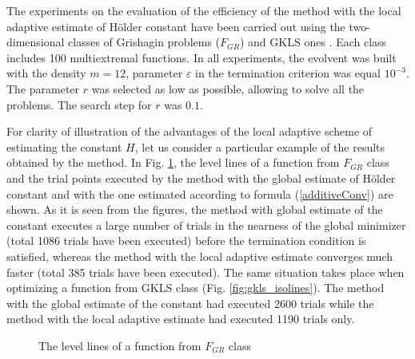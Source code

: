 \documentclass[procedia]{easychair}
\begin{document}
The experiments on the evaluation of the efficiency of the method with the local
adaptive estimate of Hölder constant have been carried out using the two-dimensional
classes of Grishagin problems (\(F_{GR}\)) \cite{grishaginClass} and GKLS ones \cite{gklsClass}. Each class
includes 100 multiextremal functions. In all experiments, the evolvent was built
with the density \(m = 12\), parameter \(\varepsilon\) in the termination criterion was equal \(10^{-3}\).
The parameter \(r\) was selected as low as possible, allowing to solve all the
problems. The search step for \(r\) was \(0.1\).
\par
For clarity of illustration of the advantages of the local adaptive scheme of estimating
the constant \(H\), let us consider a particular example of the results obtained by the method.
In Fig. \ref{fig:grish_isolines}, the level lines of a function from \(F_{GR}\) class and the trial
points executed by the method with the global estimate of Hölder constant and with
the one estimated according to formula (\ref{additiveConv}) are shown. As it is
seen from the figures, the method with global estimate of the constant executes a
large number of trials in the nearness of the global minimizer (total 1086 trials
have been executed) before the termination condition is satisfied, whereas the method
with the local adaptive estimate converges much faster (total 385 trials have been executed).
The same situation takes place when optimizing a function from GKLS class (Fig. \ref{fig:gkls_isolines}).
The method with the global estimate of the constant had executed 2600 trials while
the method with the local adaptive estimate had executed 1190 trials only.
\begin{figure}[ht]
    \centering
    \qquad
    \caption{The level lines of a function from \(F_{GR}\) class}
    \label{fig:grish_isolines}
\end{figure}
\end{document}
